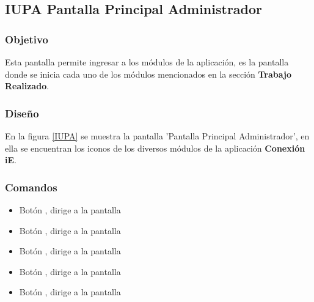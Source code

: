 \subsection{IUPA Pantalla Principal Administrador}

\subsubsection{Objetivo}

	
 	Esta pantalla permite ingresar a los módulos de la aplicación, es la pantalla donde se inicia cada uno de los módulos mencionados en la sección \textbf{Trabajo Realizado}.
\subsubsection{Diseño}


    En la figura \ref{IUPA} se muestra la pantalla 'Pantalla Principal Administrador', en ella se encuentran los iconos de los diversos módulos de la aplicación \textbf{Conexión iE}.



\subsubsection{Comandos}
\begin{itemize}
	
	\item Botón \botSalones, dirige a la pantalla 
	\item Botón \botProfesores, dirige a la pantalla 
	\item Botón \botUnidades, dirige a la pantalla 
	\item Botón \botMovilidad, dirige a la pantalla 
	\item Botón \botCursos, dirige a la pantalla 
\end{itemize}

